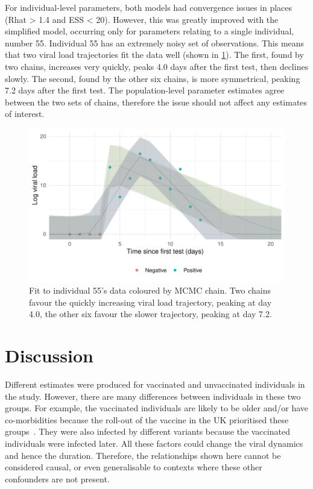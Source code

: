 \documentclass[thesis.tex]{subfiles}
\begin{document}
For individual-level parameters, both models had convergence issues in places (Rhat > 1.4 and ESS < 20).
However, this was greatly improved with the simplified model, occurring only for parameters relating to a single individual, number 55.
Individual 55 has an extremely noisy set of observations.
This means that two viral load trajectories fit the data well (shown in \cref{ATACCC:fig:individual-55}).
The first, found by two chains, increases very quickly, peaks 4.0 days after the first test, then declines slowly.
The second, found by the other six chains, is more symmetrical, peaking 7.2 days after the first test.
The population-level parameter estimates agree between the two sets of chains, therefore the issue should not affect any estimates of interest.
\begin{figure}
  \centering \includegraphics{ATACCC/fit_individual_55}
  \caption[Goodness-of-fit for individual 55]{Fit to individual 55's data coloured by MCMC chain. Two chains favour the quickly increasing viral load trajectory, peaking at day 4.0, the other six favour the slower trajectory, peaking at day 7.2. \label{ATACCC:fig:individual-55}}
\end{figure}

\section{Discussion}

Different estimates were produced for vaccinated and unvaccinated individuals in the study.
However, there are many differences between individuals in these two groups.
For example, the vaccinated individuals are likely to be older and/or have co-morbidities because the roll-out of the vaccine in the UK prioritised these groups~\autocite{naoCovidVaccination}.
They were also infected by different variants because the vaccinated individuals were infected later.
All these factors could change the viral dynamics~\autocite{russellWithinhost} and hence the duration.
Therefore, the relationships shown here cannot be considered causal, or even generalisable to contexts where these other confounders are not present.
\end{document}
